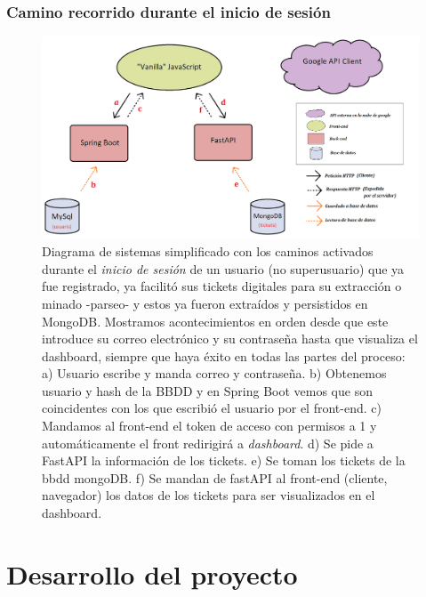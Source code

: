 \documentclass[a4paper,12pt]{report}
\begin{document}
				
		\subsection{Camino recorrido durante el inicio de sesión}
		


		\setlength{\belowcaptionskip}{3pt}
		\FloatBarrier
		\begin{figure}[H]
			\centering
			\includegraphics[width=1\textwidth]{img/diagramaSistemesAplicacioMercappCAMIINICISESSIO.png}
			\caption{Diagrama de sistemas simplificado con los caminos activados durante el \textit{inicio de sesión} de un usuario (no superusuario) que ya fue registrado, ya facilitó sus tickets digitales para su extracción o minado -parseo- y estos ya fueron extraídos y persistidos en MongoDB. Mostramos acontecimientos en orden desde que este introduce su correo electrónico y su contraseña hasta que visualiza el dashboard, siempre que haya éxito en todas las partes del proceso: a) Usuario escribe y manda correo y contraseña. b) Obtenemos usuario y hash de la BBDD y en Spring Boot vemos que son coincidentes con los que escribió el usuario por el front-end. c) Mandamos al front-end el token de acceso con permisos a 1 y automáticamente el front redirigirá a \textit{dashboard}. d) Se pide a FastAPI la información de los tickets. e) Se toman los tickets de la bbdd mongoDB. f) Se mandan de fastAPI al front-end (cliente, navegador) los datos de los tickets para ser visualizados en el dashboard.}
			\label{fig:diagramaSistemesAplicacioMercappCAMIINICISESSIO} 
		\end{figure}
		\FloatBarrier
		








		
	\pagebreak
	\chapter{Desarrollo del proyecto} %
	
\end{document}
